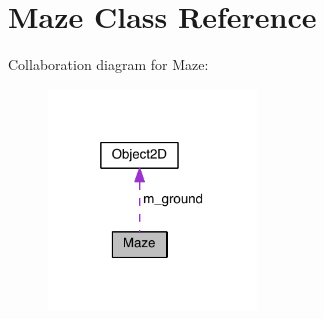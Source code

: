 \hypertarget{class_maze}{}\section{Maze Class Reference}
\label{class_maze}


Collaboration diagram for Maze\+:\nopagebreak
\begin{figure}[H]
\begin{center}
\leavevmode
\includegraphics[width=157pt]{class_maze__coll__graph}
\end{center}
\end{figure}
